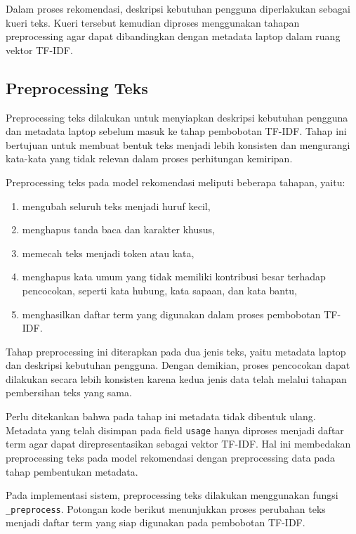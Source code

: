 Dalam proses rekomendasi, deskripsi kebutuhan pengguna diperlakukan sebagai kueri teks. Kueri tersebut kemudian diproses menggunakan tahapan preprocessing agar dapat dibandingkan dengan metadata laptop dalam ruang vektor TF-IDF.

\subsection{Preprocessing Teks}
Preprocessing teks dilakukan untuk menyiapkan deskripsi kebutuhan pengguna dan metadata laptop sebelum masuk ke tahap pembobotan TF-IDF. Tahap ini bertujuan untuk membuat bentuk teks menjadi lebih konsisten dan mengurangi kata-kata yang tidak relevan dalam proses perhitungan kemiripan.

\noindent Preprocessing teks pada model rekomendasi meliputi beberapa tahapan, yaitu:
\begin{enumerate}
\item mengubah seluruh teks menjadi huruf kecil,
\item menghapus tanda baca dan karakter khusus,
\item memecah teks menjadi token atau kata,
\item menghapus kata umum yang tidak memiliki kontribusi besar terhadap pencocokan, seperti kata hubung, kata sapaan, dan kata bantu,
\item menghasilkan daftar term yang digunakan dalam proses pembobotan TF-IDF.
\end{enumerate}

Tahap preprocessing ini diterapkan pada dua jenis teks, yaitu metadata laptop dan deskripsi kebutuhan pengguna. Dengan demikian, proses pencocokan dapat dilakukan secara lebih konsisten karena kedua jenis data telah melalui tahapan pembersihan teks yang sama.

Perlu ditekankan bahwa pada tahap ini metadata tidak dibentuk ulang. Metadata yang telah disimpan pada field \texttt{usage} hanya diproses menjadi daftar term agar dapat direpresentasikan sebagai vektor TF-IDF. Hal ini membedakan preprocessing teks pada model rekomendasi dengan preprocessing data pada tahap pembentukan metadata.

Pada implementasi sistem, preprocessing teks dilakukan menggunakan fungsi \texttt{\_preprocess}. Potongan kode berikut menunjukkan proses perubahan teks menjadi daftar term yang siap digunakan pada pembobotan TF-IDF.

